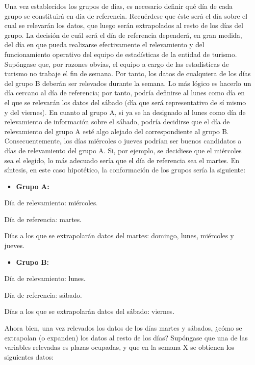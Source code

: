 \documentclass[
]{book}
\providecommand{\tightlist}{%
  \setlength{\itemsep}{0pt}\setlength{\parskip}{0pt}}
\begin{document}
Una vez establecidos los grupos de días, es necesario definir qué día de cada grupo se constituirá en día de referencia. Recuérdese que éste será el día sobre el cual se relevarán los datos, que luego serán extrapolados al resto de los días del grupo. La decisión de cuál será el día de referencia dependerá, en gran medida, del día en que pueda realizarse efectivamente el relevamiento y del funcionamiento operativo del equipo de estadísticas de la entidad de turismo. Supóngase que, por razones obvias, el equipo a cargo de las estadísticas de turismo no trabaje el fin de semana. Por tanto, los datos de cualquiera de los días del grupo B deberán ser relevados durante la semana. Lo más lógico es hacerlo un día cercano al día de referencia; por tanto, podría definirse al lunes como día en el que se relevarán los datos del sábado (día que será representativo de sí mismo y del viernes). En cuanto al grupo A, si ya se ha designado al lunes como día de relevamiento de información sobre el sábado, podría decidirse que el día de relevamiento del grupo A esté algo alejado del correspondiente al grupo B. Consecuentemente, los días miércoles o jueves podrían ser buenos candidatos a días de relevamiento del grupo A. Si, por ejemplo, se decidiese que el miércoles sea el elegido, lo más adecuado sería que el día de referencia sea el martes. En síntesis, en este caso hipotético, la conformación de los grupos sería la siguiente:

\begin{itemize}
\tightlist
\item
  \textbf{Grupo A:}
\end{itemize}

Día de relevamiento: miércoles.

Día de referencia: martes.

Días a los que se extrapolarán datos del martes: domingo, lunes, miércoles y jueves.

\begin{itemize}
\tightlist
\item
  \textbf{Grupo B:}
\end{itemize}

Día de relevamiento: lunes.

Día de referencia: sábado.

Días a los que se extrapolarán datos del sábado: viernes.

Ahora bien, una vez relevados los datos de los días martes y sábados, ¿cómo se extrapolan (o expanden) los datos al resto de los días? Supóngase que una de las variables relevadas es plazas ocupadas, y que en la semana X se obtienen los siguientes datos:
\end{document}
